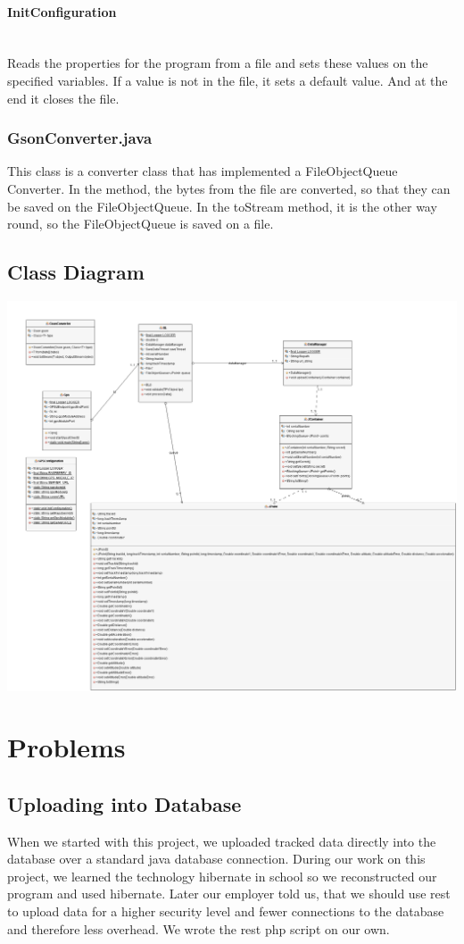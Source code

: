 \paragraph{InitConfiguration}\mbox{}\\
Reads the properties for the program from a file and sets these values on the specified variables. If a value is not in the file, it sets a default value. And at the end it closes the file.
\subsubsection{GsonConverter.java}
This class is a converter class that has implemented a FileObjectQueue Converter. In the method, the bytes from the file are converted, so that they can be saved on the FileObjectQueue. In the toStream method, it is the other way round, so the FileObjectQueue is saved on a file.
\subsection{Class Diagram}
\begin{center}
\includegraphics[width=1\textwidth]{bilder/GPS_REST_UML_Diagram}
\end{center}
\clearpageauthor
\section{Problems}
\subsection{Uploading into Database}
When we started with this project, we uploaded tracked data directly into the database over a standard java database connection. During our work on this project, we learned the technology hibernate in school so we reconstructed our program and used hibernate. Later our employer told us, that we should use \gls{rest} to upload data for a higher security level and fewer connections to the database and therefore less overhead. We wrote the \gls{rest} \gls{php} script on our own. 
